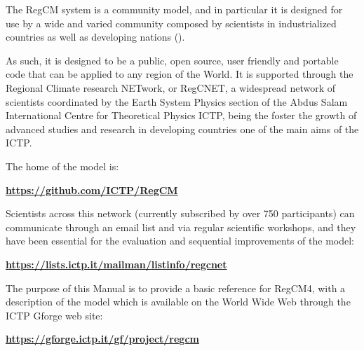 The \ac{RegCM} system is a community model, and in particular it is designed
for use by a wide and varied community composed by scientists in industrialized
countries as well as developing nations (\cite{Pal_07}).

As such, it is designed to be a public, open source, user friendly and portable
code that can be applied to any region of the World. It is supported through
the Regional Climate research NETwork, or RegCNET, a widespread network of
scientists coordinated by the Earth System Physics section of
the Abdus Salam International Centre for Theoretical Physics \ac{ICTP},
being the foster the growth of advanced studies and research in developing
countries one of the main aims of the \ac{ICTP}.

The home of the model is:

\begin{center}
	{\bf \url{https://github.com/ICTP/RegCM}}
\end{center}

Scientists across this network (currently subscribed by over 750 participants)
can communicate through an email list and via regular scientific workshops,
and they have been essential for the evaluation and sequential improvements of
the model:

\begin{center}
	{\bf \url{https://lists.ictp.it/mailman/listinfo/regcnet}}
\end{center}

The purpose of this Manual is to provide a basic reference for \ac{RegCM}4, with
a description of the model which is available on the World Wide Web through
the ICTP Gforge web site:

\begin{center}
	{\bf \url{https://gforge.ictp.it/gf/project/regcm}}
\end{center}

\vfill


